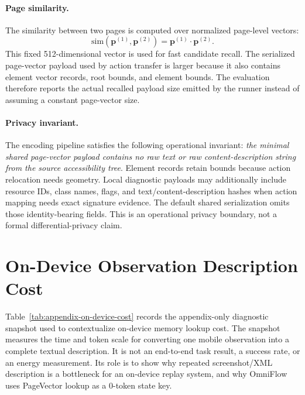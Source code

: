 \paragraph{Page similarity.}
The similarity between two pages is computed over normalized page-level
vectors:
\[
  \mathrm{sim}(\mathbf{p}^{(1)},\mathbf{p}^{(2)})
  = \mathbf{p}^{(1)} \cdot \mathbf{p}^{(2)}.
\]
This fixed 512-dimensional vector is used for fast candidate recall.  The
serialized page-vector payload used by action transfer is larger because it
also contains element vector records, root bounds, and element bounds.  The
evaluation therefore reports the actual recalled payload size emitted by the
runner instead of assuming a constant page-vector size.

\paragraph{Privacy invariant.}
The encoding pipeline satisfies the following operational invariant:
\emph{the minimal shared page-vector payload contains no raw text or raw
content-description string from the source accessibility tree}.  Element
records retain bounds because action relocation needs geometry.  Local
diagnostic payloads may additionally include resource IDs, class names, flags,
and text/content-description hashes when action mapping needs exact signature
evidence.  The default shared serialization omits those identity-bearing
fields.  This is an operational privacy boundary, not a formal
differential-privacy claim.

\section{On-Device Observation Description Cost}
\label{app:on-device-cost}

Table~\ref{tab:appendix-on-device-cost} records the appendix-only diagnostic
snapshot used to contextualize on-device memory lookup cost.  The snapshot
measures the time and token scale for converting one mobile observation into a
complete textual description.  It is not an end-to-end task result, a success
rate, or an energy measurement.  Its role is to show why repeated
screenshot/XML description is a bottleneck for an on-device replay system, and
why OmniFlow uses PageVector lookup as a 0-token state key.

